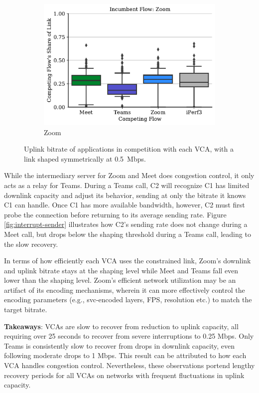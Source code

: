 \begin{figure}[t!]
\begin{subfigure}[t]{.33\textwidth}
        \includegraphics[width=1\textwidth]{figures/comp/box_plot_zoom_ul_0.5.pdf}
        \caption{Zoom}
        \label{fig:zoom_ul_box}
    \end{subfigure}
    \caption{Uplink bitrate of applications in competition with each VCA, with a link shaped symmetrically at 0.5~Mbps.}
    \label{fig:boxplot-upld}
\end{figure}




While the intermediary server for Zoom and Meet does congestion control, it only acts as a relay for Teams. During a Teams call, C2 will recognize C1 has limited downlink capacity and adjust its behavior, sending at only the bitrate it knows C1 can handle. Once C1 has more available bandwidth, however, C2 must first probe the connection before returning to its average sending rate. Figure \ref{fig:interrupt-sender} illustrates how C2's sending rate does not change during a Meet call, but drops below the shaping threshold during a Teams call, leading to the slow recovery.


In terms of how efficiently each VCA uses the constrained link, Zoom's downlink and uplink bitrate stays at the shaping level while Meet and Teams fall even lower than the shaping level. Zoom's efficient network utilization may be an artifact of its encoding mechanisms, wherein it can more effectively control the encoding parameters (e.g., svc-encoded layers, FPS, resolution etc.) to match the target bitrate.  

\begin{mdframed}[roundcorner=5pt, backgroundcolor=black!10]
\noindent \textbf{Takeaways}: VCAs are slow to recover from reduction to uplink capacity, all requiring over 25 seconds to recover from severe interruptions to 0.25 Mbps. Only Teams is consistently slow to recover from drops in downlink capacity, even following moderate drops to 1 Mbps. This result can be attributed to how each VCA handles congestion control. Nevertheless, these observations portend lengthy recovery periods for all VCAs on networks with frequent fluctuations in uplink capacity. 
\end{mdframed}


